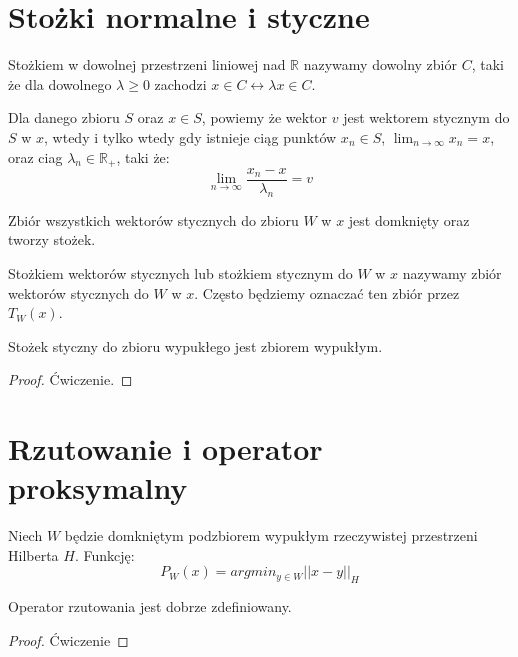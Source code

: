 \documentclass[10pt,a4paper,draft]{report}
\begin{document}
\section{Stożki normalne i styczne}

\begin{definition}[Stożka] Stożkiem w dowolnej przestrzeni liniowej nad $\mathbb{R}$ nazywamy dowolny zbiór $C$, taki że dla dowolnego $\lambda \geq 0$ zachodzi $x \in C \leftrightarrow \lambda x \in C$.
\end{definition}

\begin{definition}
Dla danego zbioru $S$ oraz $x \in S$, powiemy że wektor $v$ jest wektorem stycznym do $S$ w $x$, wtedy i tylko wtedy gdy  istnieje ciąg punktów $x_n \in S$, $\lim_{n \rightarrow \infty} x_n = x$, oraz ciag $\lambda_n \in \mathbb{R}_+$, taki że:
\[
\lim_{n \rightarrow \infty} \frac{x_n  - x}{\lambda_n} = v 
\]
\end{definition}

\begin{theorem}
Zbiór wszystkich wektorów stycznych do zbioru $W$ w $x$ jest domknięty oraz tworzy stożek.
\end{theorem}


\begin{definition}
Stożkiem wektorów stycznych lub stożkiem stycznym do $W$ w $x$ nazywamy zbiór wektorów stycznych do $W$ w $x$. Często będziemy oznaczać ten zbiór przez $T_W(x)$.
\end{definition}

\begin{theorem}
Stożek styczny do zbioru wypukłego jest zbiorem wypukłym.
\end{theorem}
\begin{proof}
Ćwiczenie.
\end{proof}

\begin{theorem}
\end{theorem}

\section{Rzutowanie i operator proksymalny}

\begin{definition}
Niech $W$ będzie domkniętym podzbiorem wypukłym rzeczywistej przestrzeni Hilberta $H$. Funkcję:
\[
P_W(x) = argmin_{y \in W} ||x - y||_H
\]
\end{definition}
\begin{theorem}
Operator rzutowania jest dobrze zdefiniowany.
\end{theorem}
\begin{proof}
Ćwiczenie
\end{proof}
\end{document}
